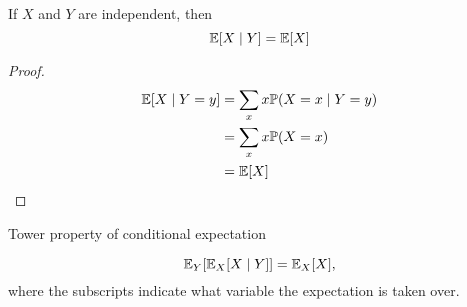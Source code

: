 %
\begin{note}
  \begin{field}
    \begin{thm}
      If $X$ and $Y$ are independent, then
      \[
        \mathbb{E}[X\mid Y] = \mathbb{E}[X]
      \]
    \end{thm}
  \end{field}
  \begin{field}
    \begin{proof}
      \begin{align*}
        \mathbb{E}[X\mid Y = y] &= \sum_{x}x\mathbb{P}(X = x\mid Y = y)\\
        &= \sum_x x\mathbb{P}(X = x)\\
        &= \mathbb{E}[X]\qedhere
      \end{align*}
    \end{proof}
  \end{field}
  \xplain{}%
\end{note}

%
\begin{note}
  \begin{field}
    Tower property of conditional expectation
  \end{field}
  \begin{field}
    \begin{thm}
      \[
        \mathbb{E}_Y[\mathbb{E}_X[X\mid Y]] = \mathbb{E}_X[X],
      \]
      where the subscripts indicate what variable the expectation is taken over.
    \end{thm}
  \end{field}
  \xplain{}%
\end{note}

